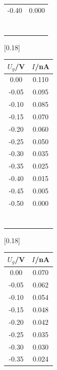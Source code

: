 \begin{table}
{\begin{tabular}{c c}
      -0.40 & 0.000 \\
      \\
      \\
      \\
      \\
      \\
      \\
      \\
      \bottomrule
    \end{tabular}
    }
  [0.18\textwidth]{
      \begin{tabular}{c c}
        \toprule
        $U_g$/\si{\volt} & $I$/\si{\nano\ampere}\\
        \midrule
        0.00 & 0.110 \\
        -0.05 & 0.095 \\
        -0.10 & 0.085 \\
        -0.15 & 0.070 \\
        -0.20 & 0.060 \\
        -0.25 & 0.050 \\
        -0.30 & 0.035 \\
        -0.35 & 0.025 \\
        -0.40 & 0.015 \\
        -0.45 & 0.005 \\
        -0.50 & 0.000 \\
        \\
        \\
        \\
        \\
        \\
        \\
        \\
        \bottomrule
      \end{tabular}
      }
    [0.18\textwidth]{
      \begin{tabular}{c c}
        \toprule
        $U_g$/\si{\volt} & $I$/\si{\nano\ampere}\\
        \midrule
        0.00 & 0.070 \\
        -0.05 & 0.062 \\
        -0.10 & 0.054 \\
        -0.15 & 0.048 \\
        -0.20 & 0.042 \\
        -0.25 & 0.035 \\
        -0.30 & 0.030 \\
        -0.35 & 0.024 \\

\end{tabular}}
\end{table}
